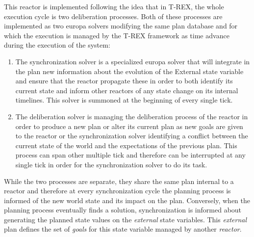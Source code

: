 This reactor is implemented following the idea that in T-REX, the
whole execution cycle is two deliberation processes. Both of these
processes are implemented as two europa solvers modifying the same
plan database and for which the execution is managed by the T-REX 
framework as time advance during the execution of the system:
\begin{enumerate}
\item The synchronization solver is a specialized europa solver that
  will integrate in the plan new information about the evolution of
  the External state variable and ensure that the reactor propagate
  these in order to both identify its current state and inform
  other reactors of any state change on its internal timelines. This
  solver is summoned at the beginning of every single tick.
\item The deliberation solver is managing the deliberation process of
  the reactor in order to produce a new plan or alter its current plan
  as new goals are given to the reactor or the synchronization solver
  identifying a conflict between the current state of the world and
  the expectations of the previous plan. This process can  span other
  multiple tick and therefore can be interrupted at any single tick in
  order for the synchronization solver to do its task.
\end{enumerate}
While the two processes are separate, they share the same plan
internal to a reactor and therefore at every synchronization cycle the
planning process is informed of the new world state and its impact on
the plan. Conversely, when the planning process eventually finds a
solution, synchronization is informed about generating the planned
state values on the {\em external} state variables. This {\em
  external} plan defines the set of {\em goals} for this state
variable managed by another {\em reactor}. 

